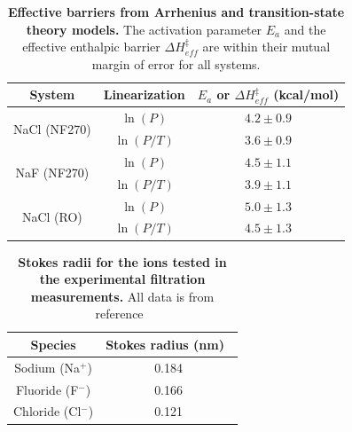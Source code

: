 \clearpage
\pagebreak

\begin{table}
    \centering
    \begin{tabular}{|c|c|c|}
        \hline
        System & Linearization & $E_a$ or $\Delta H_{eff}^{\ddagger}$ (kcal/mol) \\
        \hline
        \multirow{2}{*}{NaCl (NF270)} & $\ln (P)$   & $4.2 \pm 0.9$ \\\cline{2-3}
                                      & $\ln (P/T)$ & $3.6 \pm 0.9$ \\
        \hline
        \multirow{2}{*}{NaF (NF270)}  & $\ln (P)$   & $4.5 \pm 1.1$ \\\cline{2-3}
                                      & $\ln (P/T)$ & $3.9 \pm 1.1$ \\
        \hline
        \multirow{2}{*}{NaCl (RO)}    & $\ln (P)$   & $5.0 \pm 1.3$ \\\cline{2-3}
                                      & $\ln (P/T)$ & $4.5 \pm 1.3$ \\
        \hline
    \end{tabular}
    \caption{\textbf{Effective barriers from Arrhenius and transition-state theory models.} The activation parameter $E_a$ and the effective enthalpic barrier $\Delta H_{eff}^{\ddagger}$ are within their mutual margin of error for all systems.}
    \label{tab:effective_enthalpies} 
\end{table}

\clearpage
\pagebreak

\begin{table}
    \centering
    \begin{tabular}{|c|c|}
        \hline
         Species           & Stokes radius (nm)~\cite{nightingale_phenomenological_1959} \\
         \hline
         Sodium (Na$^+$)   & 0.184 \\ 
         \hline
         Fluoride (F$^-$)  & 0.166 \\
         \hline
         Chloride (Cl$^-$) & 0.121 \\
         \hline
    \end{tabular}
    \caption{\textbf{Stokes radii for the ions tested in the experimental filtration measurements.} All data is from reference~\cite{nightingale_phenomenological_1959}}
    \label{tab:stokes}
\end{table}